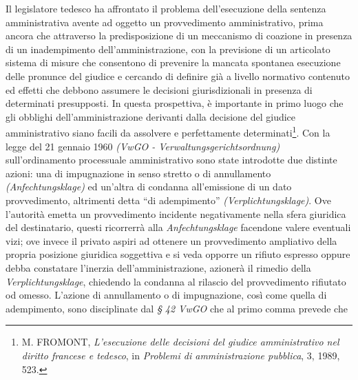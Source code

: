 \documentclass[12pt,it,a4paper,]{report}
\begin{document}
Il legislatore tedesco ha affrontato il problema dell'esecuzione della
sentenza amministrativa avente ad oggetto un provvedimento
amministrativo, prima ancora che attraverso la predisposizione di un
meccanismo di coazione in presenza di un inadempimento
dell'amministrazione, con la previsione di un articolato sistema di
misure che consentono di prevenire la mancata spontanea esecuzione delle
pronunce del giudice e cercando di definire già a livello normativo
contenuto ed effetti che debbono assumere le decisioni giurisdizionali
in presenza di determinati presupposti. In questa prospettiva, è
importante in primo luogo che gli obblighi dell'amministrazione
derivanti dalla decisione del giudice amministrativo siano facili da
assolvere e perfettamente determinati\footnote{M. FROMONT,
  \emph{L'esecuzione delle decisioni del giudice amministrativo nel
  diritto francese e tedesco}, in \emph{Problemi di amministrazione
  pubblica}, 3, 1989, 523.}. Con la legge del 21 gennaio 1960
\emph{(VwGO - Verwaltungsgerichtsordnung)} sull'ordinamento processuale
amministrativo sono state introdotte due distinte azioni: una di
impugnazione in senso stretto o di annullamento
\emph{(Anfechtungsklage)} ed un'altra di condanna all'emissione di un
dato provvedimento, altrimenti detta ``di adempimento''
\emph{(Verplichtungsklage)}. Ove l'autorità emetta un provvedimento
incidente negativamente nella sfera giuridica del destinatario, questi
ricorrerrà alla \emph{Anfechtungsklage} facendone valere eventuali vizi;
ove invece il privato aspiri ad ottenere un provvedimento ampliativo
della propria posizione giuridica soggettiva e si veda opporre un
rifiuto espresso oppure debba constatare l'inerzia dell'amministrazione,
azionerà il rimedio della \emph{Verplichtungsklage}, chiedendo la
condanna al rilascio del provvedimento rifiutato od omesso. L'azione di
annullamento o di impugnazione, così come quella di adempimento, sono
disciplinate dal \emph{§ 42 VwGO} che al primo comma prevede che
\end{document}
